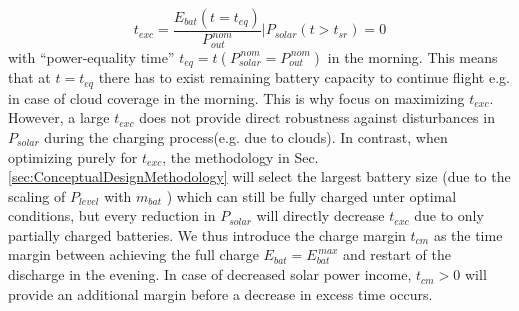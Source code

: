 \begin{equation} \label{eqn:t_exc}
t_{exc}=\frac{E_{bat}(t=t_{eq})}{P_{out}^{\,nom}} \Big| P_{solar}(t>t_{sr})=0
\end{equation}
with ``power-equality time'' $t_{eq}=t(P_{solar}^{\,nom}=P_{out}^{\,nom})$ in the morning. This means that at $t=t_{eq}$ there has to exist remaining battery capacity to continue flight e.g. in case of cloud coverage in the morning. This is why\cite{Noth_PhD,Leutenegger_JIRS} focus on maximizing $t_{exc}$. However, a large $t_{exc}$ does not provide direct robustness against disturbances in $P_{solar}$ during the charging process(e.g. due to clouds). In contrast, when optimizing purely for $t_{exc}$, the methodology in Sec. \ref{sec:ConceptualDesignMethodology} will select the largest battery size (due to the scaling of $P_{level}$ with $m_{bat}$ ) which can still be fully charged unter optimal conditions, but every reduction in $P_{solar}$ will directly decrease $t_{exc}$ due to only partially charged batteries. We thus introduce the charge margin $t_{cm}$ as the time margin between achieving the full charge $E_{bat}=E_{bat}^{\,max}$ and restart of the discharge in the evening. In case of decreased solar power income, $t_{cm}>0$ will provide an additional margin before a decrease in excess time occurs.

